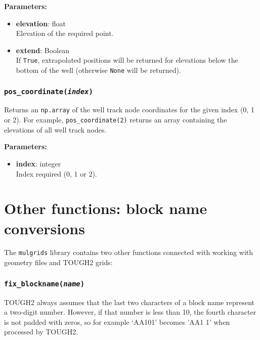 \textbf{Parameters:}
\begin{itemize}
\item \textbf{elevation}: float\\
  Elevation of the required point.
\item \textbf{extend}: Boolean\\
  If \texttt{True}, extrapolated positions will be returned for elevations below the bottom of the well (otherwise \texttt{None} will be returned).
\end{itemize}

\begin{snugshade}
\subsubsection{\texttt{pos\_coordinate(\emph{index})}}
\end{snugshade}
\label{sec:well:pos_coordinate}

Returns an \texttt{np.array} of the well track node coordinates for the given index (0, 1 or 2).  For example, \texttt{pos\_coordinate(2)} returns an array containing the elevations of all well track nodes.

\textbf{Parameters:}
\begin{itemize}
\item \textbf{index}: integer\\
  Index required (0, 1 or 2).
\end{itemize}

\section{Other functions: block name conversions}

The \texttt{mulgrids} library contains two other functions connected with working with geometry files and TOUGH2 grids:

\begin{snugshade}
\subsubsection{\texttt{fix\_blockname(\emph{name})}}
\end{snugshade}

TOUGH2 always assumes that the last two characters of a block name represent a two-digit number.  However, if that number is less than 10, the fourth character is not padded with zeros, so for example `AA101' becomes 'AA1 1' when processed by TOUGH2.


